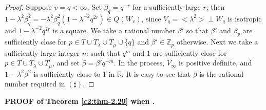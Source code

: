 \begin{proof}
Suppose $v=q<\infty$. Set $\beta_q=q^{-r}$ for a sufficiently large
$r$; then $1-\lambda^2\beta^2_q = - \lambda^2 \beta^2_q(1-\lambda^{-2}
q^{2r}) \in Q (W_v)$, since $V_q=<\lambda^2> \perp W_q$ is
isotropic and $1-\lambda^{-2} q^{2r}$ is a square. We take a rational
number $\beta'$ so that $\beta'$ and $\beta_p$ are sufficiently close
for $p \in T \cup T_{\lambda} \cup T_{\mu} \cup \{q\}$ and
$\beta' \in \mathbb{Z}_p$ otherwise. Next we take a
sufficiently large integer $m$ such that $q^m$ and 1 are sufficiently
close for $p\in T \cup T_{\lambda} \cup T_{\mu}$, and set
$\beta = \beta' q^{-m}$. In the process, $V_{\infty}$ is positive
definite, and $1-\lambda^2 \beta^2$ is sufficiently close to 1 in
$\mathbb{R}$. It is easy to see that $\beta$ is the rational number
required in $(\sharp)$.
\end{proof}


\medskip
\noindent\textbf{PROOF of Theorem \ref{c2:thm-2.29} when {}.}

